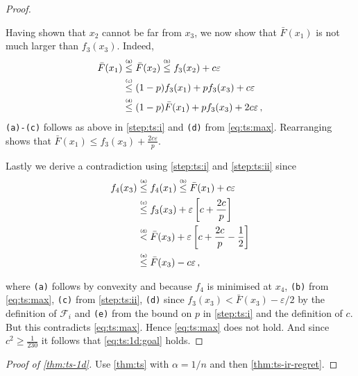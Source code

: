 \documentclass[letter, 12pt]{report}
\newcommand{\explan}[1]{\stackrel{\text{\tiny \texttt{#1}}}}
\newcommand{\sF}{\mathscr F}
\newcommand{\1}{\mathbf{1}}
\renewcommand{\epsilon}{\varepsilon}
\theoremstyle{plain}
\theoremstyle{definition}
\theoremstyle{remark}
\begin{document}
\begin{proof}
\begin{enumsteps}
        \item \label{step:ts:ii} Having shown that $x_2$ cannot be far from $x_3$,
        we now show that $\bar{F}(x_1)$ is not much larger than $f_3(x_3)$.
        Indeed,
        \begin{align*}
            \bar F(x_1)
             & \explan{(a)}\leq \bar F(x_2)
            \explan{(b)}\leq f_3(x_2) + c\epsilon                                 \\
             & \explan{(c)}\leq (1 - p) f_3(x_1) + p f_3(x_3) + c\epsilon         \\
             & \explan{(d)}\leq (1 - p) \bar F(x_1) + p f_3(x_3) + 2c\epsilon \,,
        \end{align*}
        \texttt{(a)-(c)} follows as above in \ref{step:ts:i} and \texttt{(d)} from \cref{eq:ts:max}.
        Rearranging shows that $\bar F(x_1) \leq f_3(x_3) + \frac{2c\epsilon}{p}$.

        \item \label{step:ts:iii}
        Lastly we derive a contradiction using \ref{step:ts:i} and \ref{step:ts:ii} since
        \begin{align*}
            f_4(x_3)
             & \explan{(a)}\leq f_4(x_1)
            \explan{(b)}\leq \bar F(x_1) + c\epsilon                                            \\
             & \explan{(c)}\leq f_3(x_3) + \epsilon\left[c + \frac{2c}{p}\right]                \\
             & \explan{(d)} < \bar F(x_3) + \epsilon\left[c + \frac{2c}{p} - \frac{1}{2}\right] \\
             & \explan{(e)}\leq \bar F(x_3) - c \epsilon \,,
        \end{align*}
    \end{enumsteps}
    where \texttt{(a)} follows by convexity and because $f_4$ is minimised at $x_4$,
    \texttt{(b)} from \cref{eq:ts:max},
    \texttt{(c)} from \ref{step:ts:ii},
    \texttt{(d)} since $f_3(x_3) < \bar F(x_3) - \epsilon/2$ by the definition of $\sF_i$
    and \texttt{(e)} from the bound on $p$ in \ref{step:ts:i} and the definition of $c$.
    But this contradicts \cref{eq:ts:max}.
    Hence \cref{eq:ts:max} does not hold. And since $c^2 \geq \frac{1}{230}$ it follows that \cref{eq:ts:1d:goal} holds.
\end{proof}
\begin{proof}[Proof of \cref{thm:ts-1d}]
    Use \cref{thm:ts} with $\alpha= 1/n$ and then \cref{thm:ts-ir-regret}.
\end{proof}
\end{document}
